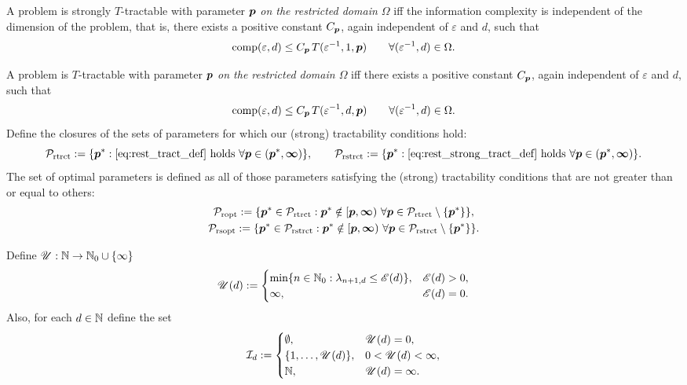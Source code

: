 \documentclass[sort&compress]{elsarticle}
\newcommand{\theM}{\mathscr{E}}
\newcommand{\theUB}{\mathscr{U}}
\begin{document}
\begin{definition}
    A problem is strongly
$T$-tractable with parameter $\boldsymbol{p}$ \emph{on the restricted domain $\Omega$} iff the information complexity is independent of the dimension of the problem, that is, there exists a positive constant $C_{\boldsymbol{p}}$, again independent of $\varepsilon$ and $d$, such that
\begin{equation} \label{eq:rest_strong_tract_def}
	\operatorname{comp}(\varepsilon,d) \le C_{\boldsymbol{p}}\, T(\varepsilon^{-1},1,\boldsymbol{p}) \qquad \forall(\varepsilon^{-1},d) \in \Omega.
\end{equation}

A problem is
$T$-tractable with parameter $\boldsymbol{p}$ \emph{on the restricted domain $\Omega$} iff there exists a positive constant $C_{\boldsymbol{p}}$, again independent of $\varepsilon$ and $d$, such that
\begin{equation} \label{eq:rest_tract_def}
	\operatorname{comp}(\varepsilon,d) \le C_{\boldsymbol{p}}\, T(\varepsilon^{-1},d,\boldsymbol{p}) \qquad \forall(\varepsilon^{-1},d) \in \Omega.
\end{equation}
 Define the closures of the sets of parameters for which our (strong) tractability conditions hold:
\begin{equation*}
	\mathcal{P}_{\textup{rtrct}} : = \{\boldsymbol{p}^* : \eqref{eq:rest_tract_def} \text{ holds }\forall \boldsymbol{p} \in (\boldsymbol{p}^*,\boldsymbol{\infty})\}, \qquad
	\mathcal{P}_{\textup{rstrct}} : = \{\boldsymbol{p}^* : \eqref{eq:rest_strong_tract_def} \text{ holds }\forall \boldsymbol{p} \in (\boldsymbol{p}^*,\boldsymbol{\infty})\}.
\end{equation*}
    The  set of optimal parameters is defined as all of those parameters satisfying the (strong) tractability conditions that are not greater than or equal to others:
\begin{gather}
	\mathcal{P}_{\textup{ropt}} : = \{\boldsymbol{p}^* \in \mathcal{P}_{\textup{rtrct}} :  \boldsymbol{p}^* \notin [\boldsymbol{p},\boldsymbol{\infty}) \ \forall \boldsymbol{p} \in  \mathcal{P}_{\textup{rtrct}} \setminus \{\boldsymbol{p}^*\} \}, \\
	\mathcal{P}_{\textup{rsopt}} : = \{\boldsymbol{p}^* \in \mathcal{P}_{\textup{rstrct}} :  \boldsymbol{p}^* \notin [\boldsymbol{p},\boldsymbol{\infty}) \ \forall \boldsymbol{p} \in  \mathcal{P}_{\textup{rstrct}} \setminus \{\boldsymbol{p}^*\} \}.
\end{gather}
\end{definition}

Define $\theUB: \naturals \to \natzero \cup \{\infty\}$
\begin{equation} \label{eq:Mddef}
    \theUB(d) := \begin{cases}
        \min\{n \in \natzero : \lambda_{n+1,d} \le \theM(d)\}, & \theM(d) > 0, \\
        \infty, & \theM(d) = 0.
    \end{cases}
\end{equation}
Also, for each $d \in \mathbb{N}$ define the set
\begin{equation} \label{eq:hIdef}
\mathcal{I}_d :=\begin{cases}
\emptyset, & \theUB(d) = 0, \\
\{1,\ldots, \theUB(d)\}, & 0 < \theUB(d) < \infty, \\
\naturals, & \theUB(d) = \infty.
\end{cases}
\end{equation}
\end{document}
